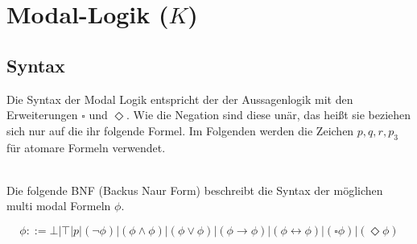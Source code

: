

\section{Modal-Logik ($K$)} %
\label{sec:modal_logic}

\subsection{Syntax} %
\label{sec:syntax}
Die Syntax der Modal Logik entspricht der der Aussagenlogik mit den Erweiterungen $\square$ und $\Diamond$. 
Wie die Negation sind diese unär, das heißt sie beziehen sich nur auf die ihr folgende Formel. Im Folgenden werden die Zeichen $p, q, r, p_3$ für atomare Formeln verwendet.\cite[S.307f]{huth2004logic}\\
\\
\begin{definition}
	\label{def:syntax}
	Die folgende BNF (Backus Naur Form) beschreibt die Syntax der möglichen multi modal Formeln $\phi$.

	\begin{equation}
		\label{eqn:bnf}
		\phi ::= \bot|\top|p|(\neg\phi)|(\phi\wedge\phi)|(\phi\vee\phi)|(\phi\rightarrow\phi)|
		(\phi\leftrightarrow\phi)|(\square\phi)|(\Diamond\phi)
	\end{equation}
\end{definition}
\cite[S.307]{huth2004logic}

